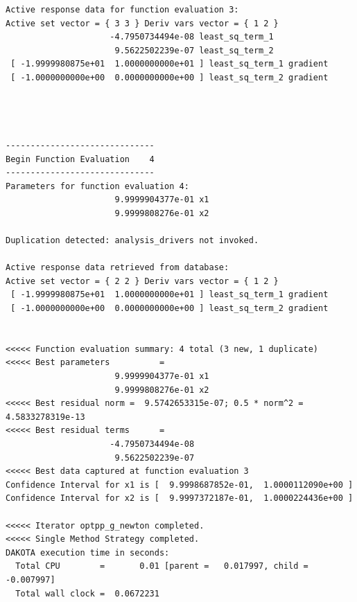 \begin{small}
\begin{verbatim}
Active response data for function evaluation 3:
Active set vector = { 3 3 } Deriv vars vector = { 1 2 }
                     -4.7950734494e-08 least_sq_term_1
                      9.5622502239e-07 least_sq_term_2
 [ -1.9999980875e+01  1.0000000000e+01 ] least_sq_term_1 gradient
 [ -1.0000000000e+00  0.0000000000e+00 ] least_sq_term_2 gradient




------------------------------
Begin Function Evaluation    4
------------------------------
Parameters for function evaluation 4:
                      9.9999904377e-01 x1
                      9.9999808276e-01 x2

Duplication detected: analysis_drivers not invoked.

Active response data retrieved from database:
Active set vector = { 2 2 } Deriv vars vector = { 1 2 }
 [ -1.9999980875e+01  1.0000000000e+01 ] least_sq_term_1 gradient
 [ -1.0000000000e+00  0.0000000000e+00 ] least_sq_term_2 gradient


<<<<< Function evaluation summary: 4 total (3 new, 1 duplicate)
<<<<< Best parameters          =
                      9.9999904377e-01 x1
                      9.9999808276e-01 x2
<<<<< Best residual norm =  9.5742653315e-07; 0.5 * norm^2 =  4.5833278319e-13
<<<<< Best residual terms      =
                     -4.7950734494e-08
                      9.5622502239e-07
<<<<< Best data captured at function evaluation 3
Confidence Interval for x1 is [  9.9998687852e-01,  1.0000112090e+00 ]
Confidence Interval for x2 is [  9.9997372187e-01,  1.0000224436e+00 ]

<<<<< Iterator optpp_g_newton completed.
<<<<< Single Method Strategy completed.
DAKOTA execution time in seconds:
  Total CPU        =       0.01 [parent =   0.017997, child =  -0.007997]
  Total wall clock =  0.0672231
\end{verbatim}
\end{small}

